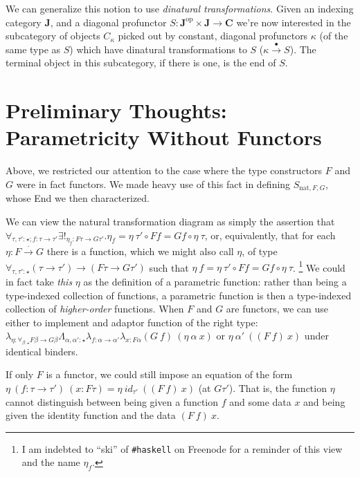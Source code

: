 \documentclass[letterpaper]{article}
\begin{document}
We can generalize this notion to use {\em dinatural transformations}.  Given
an indexing category $\mathbf{J}$, and a diagonal profunctor $S :
\mathbf{J}^{\text{op}} \times \mathbf{J} \to \mathbf{C}$ we're now
interested in the subcategory of objects $C_\kappa$ picked out by constant,
diagonal profunctors $\kappa$ (of the same type as $S$) which have dinatural
transformations to $S$ ($\kappa \stackrel{\bullet}{\to} S$).  The terminal
object in this subcategory, if there is one, is the end of $S$.

\section{Preliminary Thoughts: Parametricity Without Functors}

Above, we restricted our attention to the case where the type constructors
$F$ and $G$ were in fact functors.  We made heavy use of this fact in
defining $S_{\text{nat},F,G}$, whose End we then characterized.

We can view the natural transformation diagram as simply the assertion that
$\forall_{\tau,\tau' : \star; f : \tau \to \tau'} \exists!_{\eta_f : F \tau
\to G \tau'} .  \eta_f = \eta~\tau' \circ F f = G f \circ \eta~\tau$, or,
equivalently, that for each $\eta : F \stackrel{\cdot}{\to} G$ there is a
function, which we might also call $\eta$, of type $\forall_{\tau,\tau' :
\star} (\tau \to \tau') \to (F \tau \to G \tau')$ such that $\eta~f =
\eta~\tau' \circ F f = G f \circ \eta~\tau$.%
%
\footnote{I am indebted to ``ski'' of \texttt{\#haskell} on Freenode for a
reminder of this view and the name $\eta_f$.}
%
We could in fact take {\em this} $\eta$ as the definition of a parametric
function: rather than being a type-indexed collection of functions, a
parametric function is then a type-indexed collection of {\em higher-order}
functions.  When $F$ and $G$ are functors, we can use either to implement
and adaptor function of the right type: $\lambda_{\eta : \forall_{\beta :
\star} F \beta \to G \beta} \Lambda_{\alpha,\alpha':\star} \lambda_{f :
\alpha \to \alpha'} \lambda_{x : F \alpha} (G~f)~(\eta~\alpha~x)$ or
$\eta~\alpha'~((F~f)~x)$ under identical binders.

If only $F$ is a functor, we could still impose an equation of the form
$\eta~(f : \tau \to \tau')~(x : F \tau) = \eta~id_{\tau'}~((F~f)~x)$ (at $G
\tau'$).  That is, the function $\eta$ cannot distinguish between being
given a function $f$ and some data $x$ and being given the identity function
and the data $(F~f)~x$. 
\end{document}
